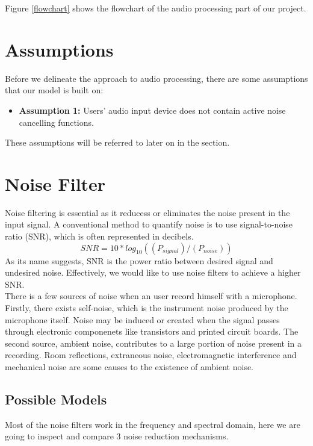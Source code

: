 Figure \ref{flowchart} shows the flowchart of the audio processing part of our project.


\section{Assumptions}
Before we delineate the approach to audio processing, there are some assumptions that our model
is built on:
\begin{itemize}
	\item \textbf{Assumption 1:} Users' audio input device does not contain active noise cancelling functions.
\end{itemize}

These assumptions will be referred to later on in the section.
\section{Noise Filter}
Noise filtering is essential as it reducess or eliminates the noise present in the input signal.
A conventional method to quantify noise is to use signal-to-noise ratio (SNR), which is often 
represented in decibels.
\[SNR=10*log_10((P_{signal})/(P_{noise}))\]
As its name suggests, SNR is the power ratio between desired signal and undesired noise. Effectively,
we would like to use noise filters to achieve a higher SNR.\\ 
There is a few sources of noise when an user record himself with a microphone.
Firstly, there exists self-noise, which is the instrument noise produced by the microphone itself.
Noise may be induced or created when the signal passes through electronic componenets like transistors 
and printed circuit boards.\cite{selfnoise} 
The second source, ambient noise, contributes to a large portion of noise present in a recording.
Room reflections, extraneous noise, electromagnetic interference and mechanical noise are some causes 
to the existence of ambient noise. 

\subsection{Possible Models}
Most of the noise filters work in the frequency and spectral domain, here we are going to inspect and
compare 3 noise reduction mechanisms.

